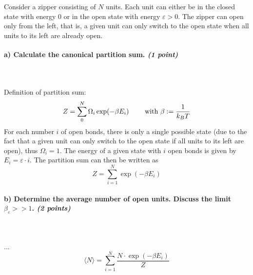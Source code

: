 Consider a zipper consisting of $N$ units. Each unit can either be in the 
closed state with energy 0 or in the open state with energy $\varepsilon>0$.
The zipper can open only from the left, that is, a given unit can only switch
to the open state when all units to its left are already open.

\paragraph{a) Calculate the canonical partition sum. \textit{(1 point)}} \ \\
    \\
    Definition of partition sum:
    \begin{equation}
        Z=\sum_0^N\Omega_i\exp(-\beta E_i)
        \ \ \ \ \ \ \ \textnormal{with }
        \beta:=\frac{1}{k_BT}
    \end{equation}
    For each number $i$ of open bonds, there is only a single possible state 
    (due to the fact that a given unit can only switch to the open state if 
    all units to its left are open), thus $\Omega_i=1$. The energy of a given 
    state with $i$ open bonds is given by $E_i=\varepsilon\cdot i$. The 
    partition sum can then be written as
    \begin{equation}
        Z=\sum_{i=1}^N\exp(-\beta E_i)
    \end{equation}

\paragraph{b) Determine the average number of open units. Discuss the limit 
    $\beta_\varepsilon>>1$. \textit{(2 points)}} \ \\
    \\
    ...
    \begin{equation}
        \langle N\rangle 
        =\sum_{i=1}^N\frac{N\cdot\exp(-\beta E_i)}{Z}
    \end{equation}

 
